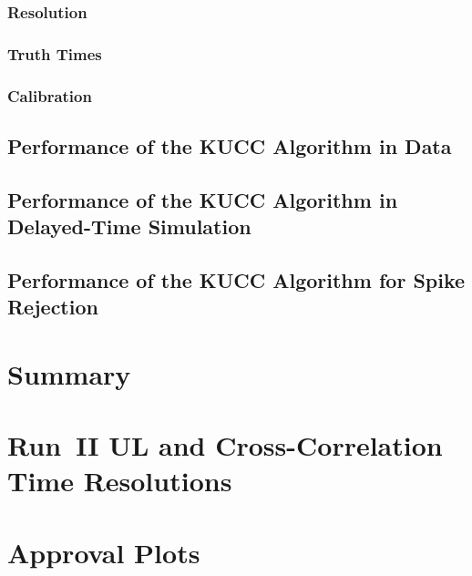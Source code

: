 \documentclass{cmspaper}
\begin{document}
\subsubsection{Resolution \label{sec:resmeth1}}

\FloatBarrier

\subsubsection{Truth Times \label{sec:resmeth2}}

\FloatBarrier

\subsubsection{Calibration \label{sec:resmeth3}}

\FloatBarrier

\subsection{Performance of the KUCC Algorithm in Data \label{sec:resdata}}

\FloatBarrier

\subsection{Performance of the KUCC Algorithm in Delayed-Time Simulation \label{sec:reslldata}}

\FloatBarrier

\subsection{Performance of the KUCC Algorithm for Spike Rejection \label{sec:resspkdata}}

\FloatBarrier

\section{Summary \label{sec:conclusion}}

\FloatBarrier

\pagebreak
\printbibliography[heading=bibnumbered,title={References}]

\appendix
\section{Run~II UL and Cross-Correlation Time Resolutions \label{sec:fullres}}


\pagebreak
\section{Approval Plots \label{sec:plots}}

\end{document}
